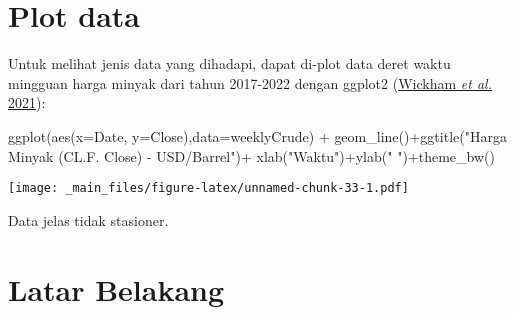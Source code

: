 \documentclass[
]{book}
\newenvironment{Shaded}{\begin{snugshade}}{\end{snugshade}}
\newcommand{\AttributeTok}[1]{\textcolor[rgb]{0.77,0.63,0.00}{#1}}
\newcommand{\FunctionTok}[1]{\textcolor[rgb]{0.00,0.00,0.00}{#1}}
\newcommand{\NormalTok}[1]{#1}
\newcommand{\SpecialCharTok}[1]{\textcolor[rgb]{0.00,0.00,0.00}{#1}}
\newcommand{\StringTok}[1]{\textcolor[rgb]{0.31,0.60,0.02}{#1}}
\begin{document}
\hypertarget{plot-data}{%
\section{Plot data}\label{plot-data}}

Untuk melihat jenis data yang dihadapi, dapat di-plot data deret waktu mingguan harga minyak dari tahun 2017-2022 dengan ggplot2 (\protect\hyperlink{ref-R-ggplot2}{Wickham \emph{et al.} 2021}):

\begin{Shaded}
\begin{Highlighting}[]
\FunctionTok{ggplot}\NormalTok{(}\FunctionTok{aes}\NormalTok{(}\AttributeTok{x=}\NormalTok{Date, }\AttributeTok{y=}\NormalTok{Close),}\AttributeTok{data=}\NormalTok{weeklyCrude) }\SpecialCharTok{+}
  \FunctionTok{geom\_line}\NormalTok{()}\SpecialCharTok{+}\FunctionTok{ggtitle}\NormalTok{(}\StringTok{"Harga Minyak (CL.F. Close) {-} USD/Barrel"}\NormalTok{)}\SpecialCharTok{+}
  \FunctionTok{xlab}\NormalTok{(}\StringTok{"Waktu"}\NormalTok{)}\SpecialCharTok{+}\FunctionTok{ylab}\NormalTok{(}\StringTok{" "}\NormalTok{)}\SpecialCharTok{+}\FunctionTok{theme\_bw}\NormalTok{()}
\end{Highlighting}
\end{Shaded}

\texttt{[image: \_main\_files/figure-latex/unnamed-chunk-33-1.pdf]}

Data jelas tidak stasioner.

\hypertarget{latar-belakang-1}{%
\section{Latar Belakang}\label{latar-belakang-1}}
\end{document}
